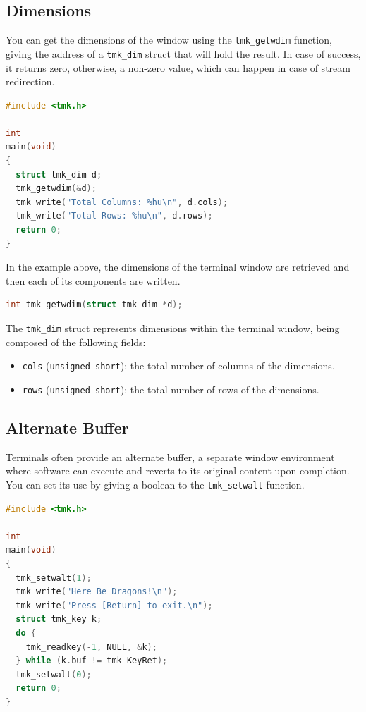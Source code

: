 \documentclass{report}
\begin{document}
\subsection{Dimensions}
You can get the dimensions of the window using the \texttt{tmk\_getwdim} function, giving the address of a \texttt{tmk\_dim} struct that will hold the result. In case of success, it returns zero, otherwise, a non-zero value, which can happen in case of stream redirection.
\begin{lstlisting}[language=c,caption=an example that gets the terminal window dimensions.]
#include <tmk.h>

int
main(void)
{
  struct tmk_dim d;
  tmk_getwdim(&d);
  tmk_write("Total Columns: %hu\n", d.cols);
  tmk_write("Total Rows: %hu\n", d.rows);
  return 0;
}
\end{lstlisting}

In the example above, the dimensions of the terminal window are retrieved and then each of its components are written.
\begin{lstlisting}[language=c,caption=the declaration of the \texttt{tmk\_getwdim} function.]
int tmk_getwdim(struct tmk_dim *d);
\end{lstlisting}

The \texttt{tmk\_dim} struct represents dimensions within the terminal window, being composed of the following fields:
\begin{itemize}
  \item \texttt{cols} (\texttt{unsigned short}): the total number of columns of the dimensions.
  \item \texttt{rows} (\texttt{unsigned short}): the total number of rows of the dimensions.
\end{itemize}
\subsection{Alternate Buffer}
Terminals often provide an alternate buffer, a separate window environment where software can execute and reverts to its original content upon completion. You can set its use by giving a boolean to the \texttt{tmk\_setwalt} function.
\begin{lstlisting}[language=c,caption=an example that shows an usage for the alternate buffer.]
#include <tmk.h>

int
main(void)
{
  tmk_setwalt(1);
  tmk_write("Here Be Dragons!\n");
  tmk_write("Press [Return] to exit.\n");
  struct tmk_key k;
  do {
    tmk_readkey(-1, NULL, &k);
  } while (k.buf != tmk_KeyRet);
  tmk_setwalt(0);
  return 0;
}
\end{lstlisting}
\end{document}
